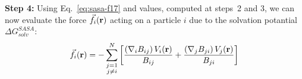 \documentclass[11pt]{book}
\begin{document}
{\bf Step 4:} Using Eq.~\ref{eq:sasa-f17} and values, computed at steps~2 and 3, we can now evaluate the force $\vec{f}_{i}({\bf r})$ acting on a particle $i$ due to the solvation potantial $\Delta G_{solv}^{SASA}$:
\begin{equation}\label{eq:sasa-comp5}
\vec{f}_{i}({\bf r})=-\sum_{\substack{j=1\\j\ne i}}^{N}\left[\frac{\left(\nabla_{i}B_{ij}\right)V_{i}({\bf r})}{B_{ij}}+\frac{\left(\nabla_{j}B_{ji}\right)V_{j}({\bf r})}{B_{ji}}\right]
\end{equation}

\end{document}
